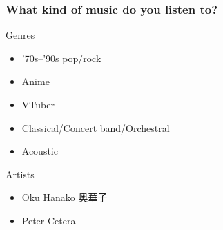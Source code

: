 \documentclass[lualatex,aspectratio=169]{beamer}
\begin{document}
  \begin{frame}
    \frametitle{What kind of music do you listen to?}
    \begin{block}{Genres}
      \begin{itemize}
        \item '70s--'90s pop/rock
        \item Anime
        \item VTuber
        \item Classical/Concert band/Orchestral
        \item Acoustic
      \end{itemize}
    \end{block}

    \begin{block}{Artists}
      \begin{itemize}
        \item Oku Hanako {\cjkfont{}奥華子}
        \item Peter Cetera
      \end{itemize}
    \end{block}
  \end{frame}

%
\end{document}
